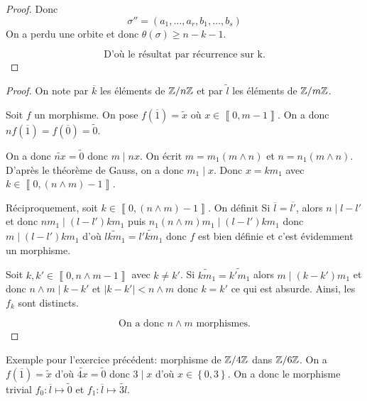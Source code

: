 \documentclass[12pt]{article}
\begin{document}
\begin{proof}
	Donc 
	\begin{equation}
		\sigma''=(a_{1},\dots,a_{r},b_{1},\dots,b_{s})
	\end{equation}
	On a perdu une orbite et donc $\theta(\sigma)\geqslant n-k-1$. 
	
	\begin{equation}
		\boxed{\text{D'où le résultat par récurrence sur k.}}
	\end{equation}
\end{proof}

\begin{proof}
	On note par $\overline{k}$ les éléments de $\mathbb{Z}/n\mathbb{Z}$ et par $\widetilde{l}$ les éléments de $\mathbb{Z}/m\mathbb{Z}$.

	Soit $f$ un morphisme. On pose $f(\overline{1})=\widetilde{x}$ où $x\in\left\llbracket 0,m-1\right\rrbracket$. On a donc $nf(\overline{1})=f(\overline{0})=\widetilde{0}$.

	On a donc $\widetilde{nx}=\widetilde{0}$ donc $m\mid nx$. On écrit $m=m_{1}(m\wedge n)$ et $n=n_{1}(m\wedge n)$. D'après le théorème de Gauss, on a donc $m_{1}\mid x$. Donc $x=km_{1}$ avec $k\in\left\llbracket 0,(n\wedge m)-1\right\rrbracket$.

	Réciproquement, soit $k\in\left\llbracket 0,(n\wedge m)-1\right\rrbracket$. On définit 
	Si $\overline{l}=\overline{l'}$, alors $n\mid l-l'$ et donc $nm_{1}\mid (l-l')km_{1}$ puis $n_{1}(n\wedge m)m_{1}\mid (l-l')km_{1}$ donc $m\mid (l-l')km_{1}$ d'où $\widetilde{lkm_{1}}=\widetilde{l'km_{1}}$ donc $f$ est bien définie et c'est évidemment un morphisme. 
	
	Soit $k,k'\in\left\llbracket 0,n\wedge m-1\right\rrbracket$ avec $k\neq k'$. Si $\widetilde{km_{1}}=\widetilde{k'm_{1}}$ alors $m\mid (k-k')m_{1}$ et donc $n\wedge m\mid k-k'$ et $\vert k-k'\vert< n\wedge m$ donc $k=k'$ ce qui est absurde. Ainsi, les $f_{k}$ sont distincts. 
	
	\begin{equation}
		\boxed{\text{On a donc }n\wedge m\text{ morphismes.}}
	\end{equation}
\end{proof}

\begin{remark}
	Exemple pour l'exercice précédent: morphisme de $\mathbb{Z}/4\mathbb{Z}$ dans $\mathbb{Z}/6\mathbb{Z}$. On a $f(\overline{1})=\widetilde{x}$ d'où $\widetilde{4x}=\widetilde{0}$ donc $3\mid x$ d'où $x\in\left\{0,3\right\}$. On a donc le morphisme trivial $f_{0}\colon \overline{l}\mapsto\widetilde{0}$ et $f_{1}\colon\overline{l}\mapsto\widetilde{3l}$.
\end{remark}
\end{document}
